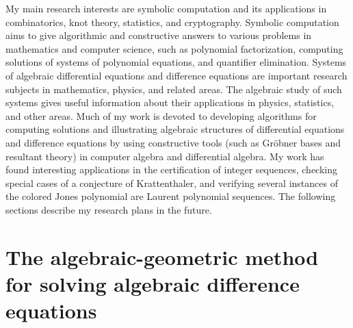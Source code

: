 \documentclass[10pt,a4paper]{article}
\begin{document}
My main research interests are symbolic computation and its applications in combinatorics, knot theory, statistics, 
and cryptography.  Symbolic computation aims to give algorithmic and constructive answers 
to various problems in mathematics and computer science, such as polynomial factorization, computing solutions of systems of polynomial equations, 
and quantifier elimination. Systems of algebraic differential equations and difference equations are important research subjects in mathematics, physics, and related areas. 
The algebraic study of such systems gives useful information about their applications in physics, statistics, and other areas. 
Much of my work is devoted to developing algorithms for  computing solutions and illustrating algebraic structures of differential equations and difference equations
by using constructive tools (such as Gr\"obner bases and resultant theory) in computer algebra and differential algebra. 
My work has found interesting applications in the certification of integer sequences, checking special cases of a conjecture of Krattenthaler, and verifying 
several instances of the colored Jones polynomial are Laurent polynomial sequences.  
The following sections describe my research plans in the future. 

\section*{The algebraic-geometric method for solving algebraic difference equations} \label{SECT:AODE}
\end{document}
